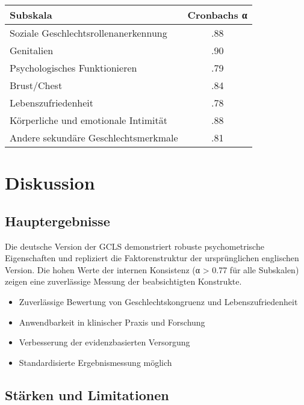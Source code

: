 \documentclass[11pt,a4paper]{article}
\begin{document}
\begin{center}
\begin{tabular}{lc}
\toprule
\textbf{Subskala} & \textbf{Cronbachs α} \\
\midrule
Soziale Geschlechtsrollenanerkennung & .88 \\
Genitalien & .90 \\
Psychologisches Funktionieren & .79 \\
Brust/Chest & .84 \\
Lebenszufriedenheit & .78 \\
Körperliche und emotionale Intimität & .88 \\
Andere sekundäre Geschlechtsmerkmale & .81 \\
\bottomrule
\end{tabular}
\end{center}

\section{Diskussion}

\subsection{Hauptergebnisse}

Die deutsche Version der GCLS demonstriert robuste psychometrische Eigenschaften und repliziert die Faktorenstruktur der ursprünglichen englischen Version. Die hohen Werte der internen Konsistenz (α > 0.77 für alle Subskalen) zeigen eine zuverlässige Messung der beabsichtigten Konstrukte.

\begin{tcolorbox}[colback=darkblue!10,colframe=darkblue,title=\textbf{Klinische Implikationen},arc=2mm]
\begin{itemize}
    \item Zuverlässige Bewertung von Geschlechtskongruenz und Lebenszufriedenheit
    \item Anwendbarkeit in klinischer Praxis und Forschung
    \item Verbesserung der evidenzbasierten Versorgung
    \item Standardisierte Ergebnismessung möglich
\end{itemize}
\end{tcolorbox}

\subsection{Stärken und Limitationen}
\end{document}

